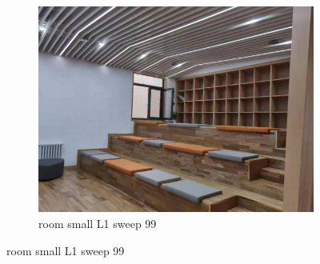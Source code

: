 \documentclass[11pt]{article}
\begin{document}
\begin{figure}[ht!]
\begin{subfigure}[]{0.333\linewidth}
        \centering
        \includegraphics[width=\linewidth]{fig/restoration/room_small/L1/gibbs_99.jpg}
        \caption{room small L1 sweep 99}
    \end{subfigure}%
\end{figure}
\end{document}
